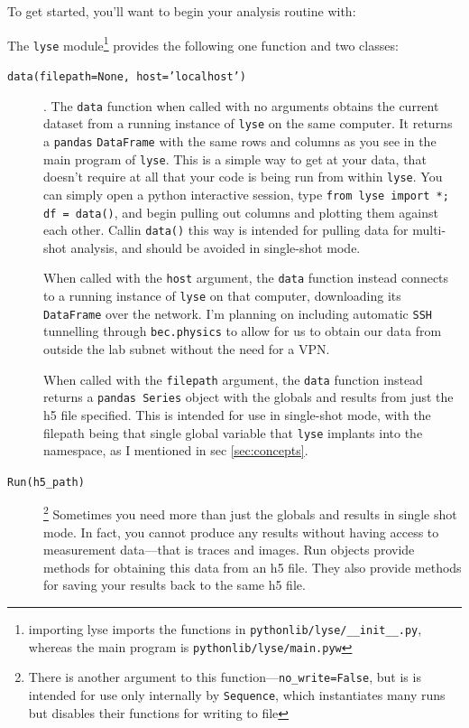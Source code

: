 \documentclass[a4paper,11pt,titlepage]{article}
\begin{document}
To get started, you'll want to begin your analysis routine with:

The \texttt{lyse} module\footnote{importing lyse imports the functions in \texttt{pythonlib/lyse/\_\_init\_\_.py}, whereas the main program is \texttt{pythonlib/lyse/main.pyw}} provides the following one function and two classes:
\begin{description}
\item[\texttt{data(filepath=None, host='localhost')}]. The \texttt{data} function when called with no arguments obtains the current dataset from a running instance of \texttt{lyse} on the same computer. It returns a \texttt{pandas} \texttt{DataFrame} with the same rows and columns as you see in the main program of \texttt{lyse}. This is a simple way to get at your data, that doesn't require at all that your code is being run from within \texttt{lyse}. You can simply open a python interactive session, type \texttt{from lyse import *; df = data()}, and begin pulling out columns and plotting them against each other. Callin \texttt{data()} this way is intended for pulling data for multi-shot analysis, and should be avoided in single-shot mode. 

When called with the \texttt{host} argument, the \texttt{data} function instead connects to a running instance of \texttt{lyse} on that computer, downloading its \texttt{DataFrame} over the network. I'm planning on including automatic \texttt{SSH} tunnelling through \texttt{bec.physics} to allow for us to obtain our data from outside the lab subnet without the need for a VPN.

When called with the \texttt{filepath} argument, the \texttt{data} function instead returns a \texttt{pandas Series} object with the globals and results from just the h5 file specified. This is intended for use in single-shot mode, with the filepath being that single global variable that \texttt{lyse} implants into the namespace, as I mentioned in sec \ref{sec:concepts}.

\item[\texttt{Run(h5\_path)}]\footnote{There is another argument to this function---\texttt{no\_write=False}, but is is intended for use only internally by \texttt{Sequence}, which instantiates many runs but disables their functions for writing to file} Sometimes you need more than just the globals and results in single shot mode. In fact, you cannot produce any results without having access to measurement data---that is traces and images. Run objects provide methods for obtaining this data from an h5 file. They also provide methods for saving your results back to the same h5 file. 


\end{description}
\end{document}
